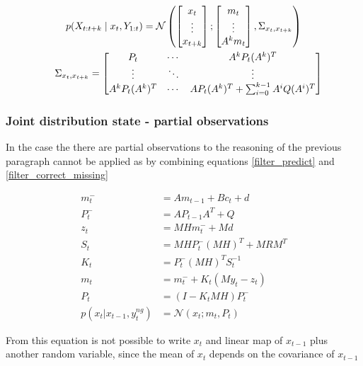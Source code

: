\documentclass{article}
\newcommand{\norm}[3]{\mathcal{N}\left(#1; #2, #3\right)} %
\let\Oldsubsubsection\subsubsection
\renewcommand{\subsubsection}{\FloatBarrier\Oldsubsubsection}
\begin{document}
\begin{multline}\label{p_X_final}
p(X_{t:t+k}\mid x_t, Y_{1:t}) =\norm{\begin{bmatrix}x_t\\\vdots\\x_{t+k}\end{bmatrix}}{\begin{bmatrix}m_t\\\vdots\\A^km_t\end{bmatrix}}{\Sigma_{x_t, x_{t+k}}}\\
\shoveleft\Sigma_{x_t, x_{t+k}} = {\begin{bmatrix}P_t & \cdots & A^kP_t(A^k)^T\\ \vdots & \ddots & \vdots \\A^kP_t(A^k)^T & \cdots & AP_t(A^k)^T + \sum_{i=0}^{k-1} A^iQ(A^i)^T\end{bmatrix}}
\end{multline}



\subsubsection{Joint distribution state - partial observations}

In the case the there are partial observations to the reasoning of the previous paragraph cannot be applied as by combining equations \ref{filter_predict} and \ref{filter_correct_missing}

\begin{equation}\label{filter_combined}
\begin{split}
    m_t^- &= Am_{t-1} + B c_t + d\\
    P_t^- &= AP_{t-1}A^T + Q\\
    z_t &= MHm_t^- + Md\\
    S_t &= MHP_t^-(MH)^T + MRM^T\\
    K_t &= P_t^-(MH)^TS_t^{-1}\\
    m_t &= m_t^- + K_t(My_t - z_t)\\
    P_t &= (I-K_tMH)P_t^-\\
    p(x_t|x_{t-1}, y^{ng}_t) &= \mathcal{N}(x_t; m_t, P_t)
\end{split}
\end{equation}

From this equation is not possible to write $x_t$ and linear map of $x_{t-1}$ plus another random variable, since the mean of $x_t$ depends on the covariance of $x_{t-1}$ 
    
\end{document}
